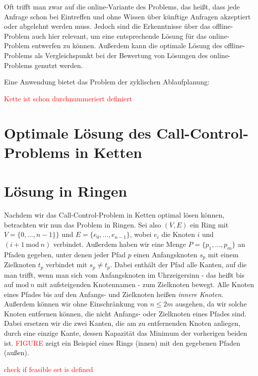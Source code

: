 \documentclass[11pt]{article}
\theoremstyle{definition}
\theoremstyle{theorem}
\theoremstyle{theorem}
\newcommand\todo[1]{\textcolor{red}{#1}}
\newcommand{\Mod}{~\mathrm{mod}~}
\begin{document}
    Oft trifft man zwar auf die online-Variante des Problems, das heißt, dass jede Anfrage schon bei Eintreffen und
    ohne Wissen über künftige Anfragen akzeptiert oder abgelehnt werden muss.
    Jedoch sind die Erkenntnisse über das offline-Problem auch hier relevant, um eine entsprechende Lösung für das
    online-Problem entwerfen zu können.
    Außerdem kann die optimale Lösung des offline-Problems als Vergleichspunkt bei der Bewertung von Lösungen des
    online-Problems genutzt werden.

    Eine Anwendung bietet das Problem der zyklischen Ablaufplanung:

    \todo{Kette ist schon durchnummeriert definiert}

	\section{Optimale Lösung des Call-Control-Problems in Ketten}\label{sec:call-control-in-chains}
	

    \section{Lösung in Ringen}\label{sec:call-control-in-rings}
    Nachdem wir das Call-Control-Problem in Ketten optimal lösen können, betrachten wir nun das Problem in Ringen.
    Sei also $(V, E)$ ein Ring mit $V=\{0,\dots,n-1 \}\}$ und $E=\{e_0, \dots, e_{n-1}\}$, wobei $e_i$ die
    Knoten $i$ und $(i+1 \Mod n)$ verbindet.
    Außerdem haben wir eine Menge $P=\{p_1, \dots, p_m\}$ an Pfaden gegeben, unter denen jeder Pfad $p$ einen
    Anfangsknoten $s_p$ mit einem Zielknoten $t_p$ verbindet mit $s_p \neq t_p$.
    Dabei enthält der Pfad alle Kanten, auf die man trifft, wenn man sich vom Anfangsknoten im Uhrzeigersinn - das heißt
    bis auf $\mathrm{mod}~n$ mit aufsteigenden Knotennamen - zum Zielknoten bewegt.
    Alle Knoten eines Pfades bis auf den Anfangs- und Zielknoten heißen {\em innere Knoten}.
    Außerdem können wir ohne Einschränkung von $n \leq 2m$ ausgehen, da wir solche Knoten entfernen können, die nicht
    Anfangs- oder Zielknoten eines Pfades sind.
    Dabei ersetzen wir die zwei Kanten, die am zu entfernenden Knoten anliegen, durch eine einzige Kante, dessen
    Kapazität das Minimum der vorherigen beiden ist.
    \todo{FIGURE} zeigt ein Beispiel eines Rings (innen) mit den gegebenen Pfaden (außen).

    \todo{check if feasible set is defined}
\end{document}
